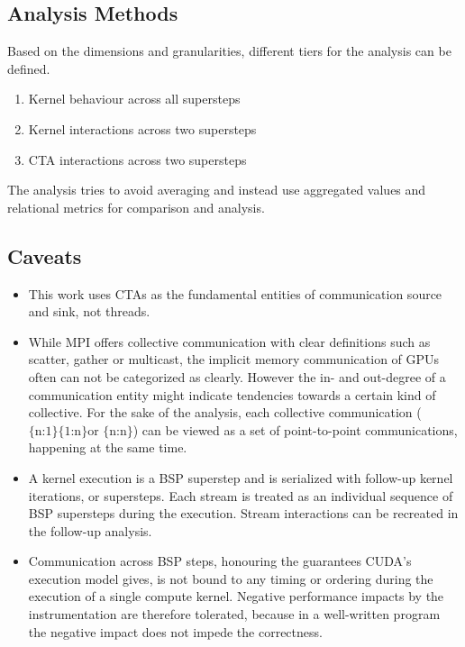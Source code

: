 \subsection{Analysis Methods}\label{methodik:methods}
Based on the dimensions and granularities, different tiers for the analysis can be defined.
\begin{enumerate}[I]
	\item Kernel behaviour across all supersteps
	\item Kernel interactions across two supersteps
	\item CTA interactions across two supersteps
\end{enumerate}
The analysis tries to avoid averaging and instead use aggregated values and relational metrics for comparison and analysis.


\subsection{Caveats}\label{collectives}
\begin{itemize}
	\item This work uses CTAs as the fundamental entities of communication source and sink, not threads.
	\item While MPI offers collective communication with clear definitions such as scatter, gather or multicast, the implicit memory communication of GPUs often can not be categorized as clearly. However the in- and out-degree of a communication entity might indicate tendencies towards a certain kind of collective.
	For the sake of the analysis, each collective communication ($\textrm{\{n:1\} \{1:n\} or \{n:n\}} $) can be viewed as a set of point-to-point communications, happening at the same time.
	\item  A kernel execution is a BSP superstep and is serialized with follow-up kernel iterations, or supersteps. Each stream is treated as
	an individual sequence of BSP supersteps during the execution. Stream interactions can be recreated in the follow-up analysis.
	\item Communication across BSP steps, honouring the guarantees CUDA's execution model gives, is not bound to any timing or ordering during the execution of a single compute kernel. Negative performance impacts by the instrumentation are therefore tolerated, 
	because in a well-written program the negative impact does not impede the correctness.
\end{itemize}